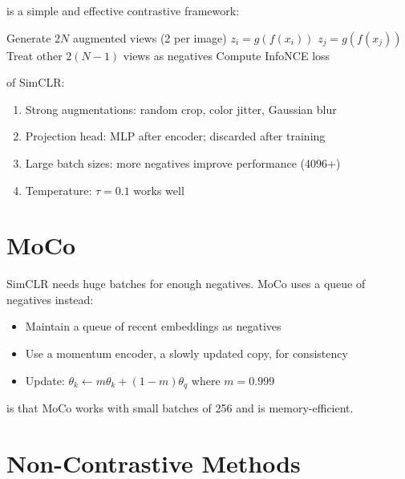  is a simple and effective contrastive framework:

\begin{algorithm}[H]
\caption{SimCLR}
\begin{algorithmic}[1]
    \State Generate $2N$ augmented views (2 per image)
        \State $z_i = g(f(x_i))$ 
        \State $z_j = g(f(x_j))$
        \State Treat other $2(N-1)$ views as negatives
        \State Compute InfoNCE loss
    \EndFor
\EndFor
\end{algorithmic}
\end{algorithm}

 of SimCLR:
\begin{enumerate}
    \item Strong augmentations: random crop, color jitter, Gaussian blur
    \item Projection head: MLP after encoder; discarded after training
    \item Large batch sizes: more negatives improve performance (4096+)
    \item Temperature: $\tau = 0.1$ works well
\end{enumerate}


\section{MoCo}


SimCLR needs huge batches for enough negatives. MoCo uses a queue of negatives instead:

\begin{itemize}
    \item Maintain a queue of recent embeddings as negatives
    \item Use a momentum encoder, a slowly updated copy, for consistency
    \item Update: $\theta_k \gets m \theta_k + (1-m) \theta_q$ where $m = 0.999$
\end{itemize}

 is that MoCo works with small batches of 256 and is memory-efficient.


\section{Non-Contrastive Methods}

